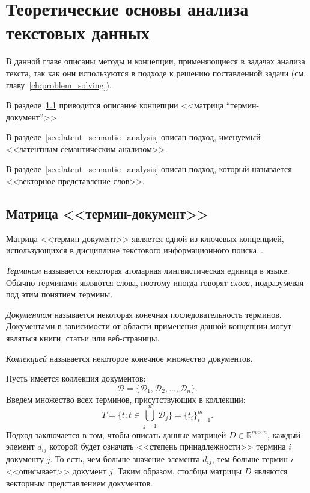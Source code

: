 \chapter{Теоретические основы анализа текстовых данных}

В данной главе описаны методы и концепции, применяющиеся в
задачах анализа текста, так как они используются в подходе
к решению поставленной задачи (см. главу~\ref{ch:problem_solving}).

В разделе~\ref{sec:term_document_matrix} приводится описание
концепции <<матрица “термин-документ”>>.

В разделе~\ref{sec:latent_semantic_analysis} описан подход,
именуемый <<латентным семантическим анализом>>.

В разделе~\ref{sec:latent_semantic_analysis} описан подход,
который называется <<векторное представление слов>>.

\section{Матрица <<термин-документ>>}
\label{sec:term_document_matrix}

Матрица <<термин-документ>> является одной из ключевых концепцией,
использующихся в дисциплине текстового информационного 
поиска~\cite{manning2008introduction}. 

\textit{Термином} называется некоторая атомарная лингвистическая
единица в языке. Обычно терминами являются слова, поэтому иногда
говорят \textit{слова}, подразумевая под этим понятием термины.

\textit{Документом} называется некоторая конечная последовательность
терминов. Документами в зависимости от области применения данной концепции
могут являться книги, статьи или веб-страницы.

\textit{Коллекцией} называется некоторое конечное множество документов.

Пусть имеется коллекция документов:
\[
    \mathcal{D} = \{\mathcal{D}_1, \mathcal{D}_2,...,\mathcal{D}_n\}.
\]
Введём множество всех терминов, присутствующих в коллекции:
\[
    T = \{t \colon t \in \bigcup_{j=1}^{n} \mathcal{D}_j\} = \{t_i\}_{i=1}^{m}.
\]
Подход заключается в том, чтобы описать данные матрицей 
$D \in \mathbb{R}^{m \times n}$, каждый элемент $d_{ij}$ которой будет
означать <<степень принадлежности>> термина $i$ документу $j$. То есть,
чем больше значение элемента $d_{ij}$, тем больше термин $i$ <<описывает>>
документ $j$. Таким образом, столбцы матрицы $D$ являются векторным
представлением документов.

